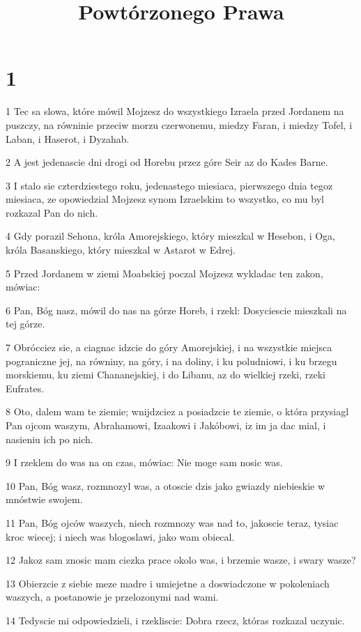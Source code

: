 

\title{Powtórzonego Prawa}


\chapter{1}

\par 1 Tec sa slowa, które mówil Mojzesz do wszystkiego Izraela przed Jordanem na puszczy, na równinie przeciw morzu czerwonemu, miedzy Faran, i miedzy Tofel, i Laban, i Haserot, i Dyzahab.
\par 2 A jest jedenascie dni drogi od Horebu przez góre Seir az do Kades Barne.
\par 3 I stalo sie czterdziestego roku, jedenastego miesiaca, pierwszego dnia tegoz miesiaca, ze opowiedzial Mojzesz synom Izraelskim to wszystko, co mu byl rozkazal Pan do nich.
\par 4 Gdy porazil Sehona, króla Amorejskiego, który mieszkal w Hesebon, i Oga, króla Basanskiego, który mieszkal w Astarot w Edrej.
\par 5 Przed Jordanem w ziemi Moabskiej poczal Mojzesz wykladac ten zakon, mówiac:
\par 6 Pan, Bóg nasz, mówil do nas na górze Horeb, i rzekl: Dosyciescie mieszkali na tej górze.
\par 7 Obrócciez sie, a ciagnac idzcie do góry Amorejskiej, i na wszystkie miejsca pograniczne jej, na równiny, na góry, i na doliny, i ku poludniowi, i ku brzegu morskiemu, ku ziemi Chananejskiej, i do Libanu, az do wielkiej rzeki, rzeki Eufrates.
\par 8 Oto, dalem wam te ziemie; wnijdzciez a posiadzcie te ziemie, o która przysiagl Pan ojcom waszym, Abrahamowi, Izaakowi i Jakóbowi, iz im ja dac mial, i nasieniu ich po nich.
\par 9 I rzeklem do was na on czas, mówiac: Nie moge sam nosic was.
\par 10 Pan, Bóg wasz, rozmnozyl was, a otoscie dzis jako gwiazdy niebieskie w mnóstwie swojem.
\par 11 Pan, Bóg ojców waszych, niech rozmnozy was nad to, jakoscie teraz, tysiac kroc wiecej; i niech was blogoslawi, jako wam obiecal.
\par 12 Jakoz sam znosic mam ciezka prace okolo was, i brzemie wasze, i swary wasze?
\par 13 Obierzcie z siebie meze madre i umiejetne a doswiadczone w pokoleniach waszych, a postanowie je przelozonymi nad wami.
\par 14 Tedyscie mi odpowiedzieli, i rzekliscie: Dobra rzecz, któras rozkazal uczynic.
